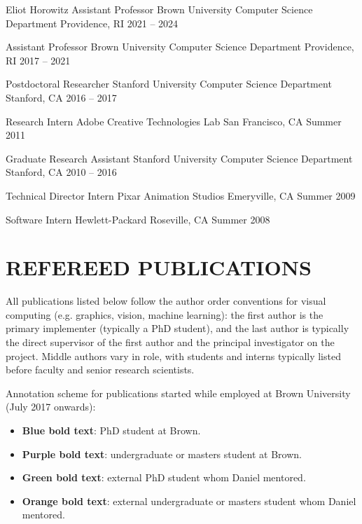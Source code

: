 \documentclass[line,margin]{res}
\begin{document}
\begin{resume}
\job
{Eliot Horowitz Assistant Professor}
{Brown University Computer Science Department}
{Providence, RI}
{2021 -- 2024}

\job
{Assistant Professor}
{Brown University Computer Science Department}
{Providence, RI}
{2017 -- 2021}

\job
{Postdoctoral Researcher}
{Stanford University Computer Science Department}
{Stanford, CA}
{2016 -- 2017}

\job
{Research Intern}
{Adobe Creative Technologies Lab}
{San Francisco, CA}
{Summer 2011}

\job
{Graduate Research Assistant}
{Stanford University Computer Science Department}
{Stanford, CA}
{2010 -- 2016}

\job
{Technical Director Intern}
{Pixar Animation Studios}
{Emeryville, CA}
{Summer 2009}

\job
{Software Intern}
{Hewlett-Packard}
{Roseville, CA}
{Summer 2008}


\section{REFEREED PUBLICATIONS}

\newcommand{\pubtitle}[1]{\textbf{#1}}
\newcommand{\pubauthors}[1]{#1}
\newcommand{\pubvenue}[1]{\emph{#1}}
\newcommand{\pubaward}[1]{\textsc{#1}}

All publications listed below follow the author order conventions for visual computing (e.g. graphics, vision, machine learning): the first author is the primary implementer (typically a PhD student), and the last author is typically the direct supervisor of the first author and the principal investigator on the project.
Middle authors vary in role, with students and interns typically listed before faculty and senior research scientists.

\newcommand{\myphd}[1]{\textbf{\color{tblue}#1}}
\newcommand{\mystud}[1]{\textbf{\color{tpurple}#1}}
\newcommand{\extphd}[1]{\textbf{\color{tgreen}#1}}
\newcommand{\extstud}[1]{\textbf{\color{torange}#1}}

Annotation scheme for publications started while employed at Brown University (July 2017 onwards):
\begin{itemize}
	\item \myphd{Blue bold text}: PhD student at Brown.
	\item \mystud{Purple bold text}: undergraduate or masters student at Brown.
	\item \extphd{Green bold text}: external PhD student whom Daniel mentored.
	\item \extstud{Orange bold text}: external undergraduate or masters student whom Daniel mentored.
\end{itemize}


\end{resume}
\end{document}
